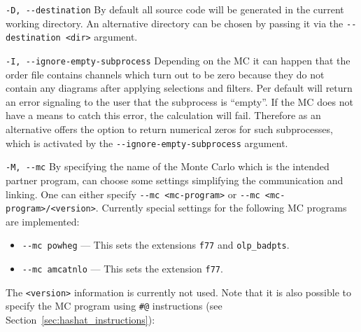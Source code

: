 \begin{basedescript}{\desclabelstyle{\pushlabel}}
%
      \item[\hspace{-1em}]\colorbox{gray!30}{\lstinline[style=sh]|-D, --destination|} By default all source code will be generated in the current working directory. An alternative directory can be chosen by passing it via the \lstinline[style=sh]|--destination <dir>| argument.
%
      \item[\hspace{-1em}]\colorbox{gray!30}{\lstinline[style=sh]|-I, --ignore-empty-subprocess|} Depending on the MC it can happen that the order file contains channels which turn out to be zero because they do not contain any diagrams after applying selections and filters. Per default \gosam will return an error signaling to the user that the subprocess is ``empty''. If the MC does not have a means to catch this error, the calculation will fail. Therefore as an alternative \gosam offers the option to return numerical zeros for such subprocesses, which is activated by the \lstinline[style=sh]|--ignore-empty-subprocess| argument.
%
      \item[\hspace{-1em}]\colorbox{gray!30}{\lstinline[style=sh]|-M, --mc|} By specifying the name of the Monte Carlo which is the intended partner program, \gosam can choose some settings simplifying the communication and linking. One can either specify \lstinline[style=sh]|--mc <mc-program>| or \lstinline[style=sh]|--mc <mc-program>/<version>|. Currently special settings for the following MC programs are implemented:
            \begin{itemize}
                  \item[\hspace{-1em}]\lstinline[style=sh]|--mc powheg| --- This sets the extensions \texttt{f77} and \texttt{olp\_badpts}.
                  \item[\hspace{-1em}]\lstinline[style=sh]|--mc amcatnlo| --- This sets the extension \texttt{f77}.
            \end{itemize}
      The \lstinline[style=sh]|<version>| information is currently not used. Note that it is also possible to specify the MC program using \texttt{\#@} instructions (see Section~\ref{sec:hashat_instructions}):

\end{basedescript}
